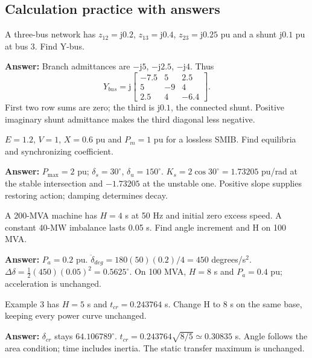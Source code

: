 \documentclass[11pt,a4paper]{article}
\newenvironment{Worked}[1]{\begin{tcolorbox}[breakable=false,colback=white,colframe=teal,colbacktitle=pale,coltitle=ink,title={#1}]}{\end{tcolorbox}}
\newcommand{\jj}{\mathrm j}
\begin{document}
\subsection{Calculation practice with answers}
\begin{Worked}{Practice A: construct Y-bus with a shunt}
A three-bus network has $z_{12}=\jj0.2$, $z_{13}=\jj0.4$, $z_{23}=\jj0.25$ pu and a shunt $\jj0.1$ pu at bus 3. Find Y-bus.

\textbf{Answer:} Branch admittances are $-\jj5$, $-\jj2.5$, $-\jj4$. Thus
\[
Y_{bus}=\jj\begin{bmatrix}-7.5&5&2.5\\5&-9&4\\2.5&4&-6.4\end{bmatrix}.
\]
First two row sums are zero; the third is $\jj0.1$, the connected shunt. Positive imaginary shunt admittance makes the third diagonal less negative.
\end{Worked}
\begin{Worked}{Practice B: transfer and slope}
$E=1.2$, $V=1$, $X=0.6$ pu and $P_m=1$ pu for a lossless SMIB. Find equilibria and synchronizing coefficient.

\textbf{Answer:} $P_{\max}=2$ pu; $\delta_s=30^\circ$, $\delta_u=150^\circ$. $K_s=2\cos30^\circ=1.73205$ pu/rad at the stable intersection and $-1.73205$ at the unstable one. Positive slope supplies restoring action; damping determines decay.
\end{Worked}
\begin{Worked}{Practice C: inertia and angle units}
A 200-MVA machine has $H=4$ s at 50 Hz and initial zero excess speed. A constant 40-MW imbalance lasts 0.05 s. Find angle increment and H on 100 MVA.

\textbf{Answer:} $P_a=0.2$ pu. $\ddot\delta_{deg}=180(50)(0.2)/4=450$ degrees/s$^2$. $\Delta\delta=\tfrac12(450)(0.05)^2=0.5625^\circ$. On 100 MVA, $H=8$ s and $P_a=0.4$ pu; acceleration is unchanged.
\end{Worked}
\begin{Worked}{Practice D: change inertia without changing the network}
Example 3 has $H=5$ s and $t_{cr}=0.243764$ s. Change H to 8 s on the same base, keeping every power curve unchanged.

\textbf{Answer:} $\delta_{cr}$ stays $64.106789^\circ$. $t_{cr}=0.243764\sqrt{8/5}\simeq0.30835$ s. Angle follows the area condition; time includes inertia. The static transfer maximum is unchanged.
\end{Worked}
\end{document}
